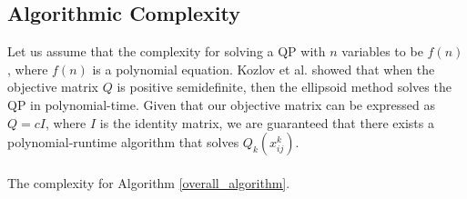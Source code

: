 \documentclass[sigconf]{acmart}
\DeclareMathOperator*{\argmin}{arg\,min}
\begin{document}

\subsection{Algorithmic Complexity}
Let us assume that the complexity for solving a QP with $n$ variables to be $f(n)$, where $f(n)$ is a polynomial equation. Kozlov et al. \cite{kozlov1980polynomial} showed that when the objective matrix $Q$ is positive semidefinite, then the ellipsoid method solves the QP in polynomial-time. Given that our objective matrix can be expressed as $Q = cI$, where $I$ is the identity matrix, we are guaranteed that there exists a polynomial-runtime algorithm that solves $Q_k(x_{ij}^k)$. \\\\
The complexity for Algorithm \ref{overall_algorithm}.
\end{document}
